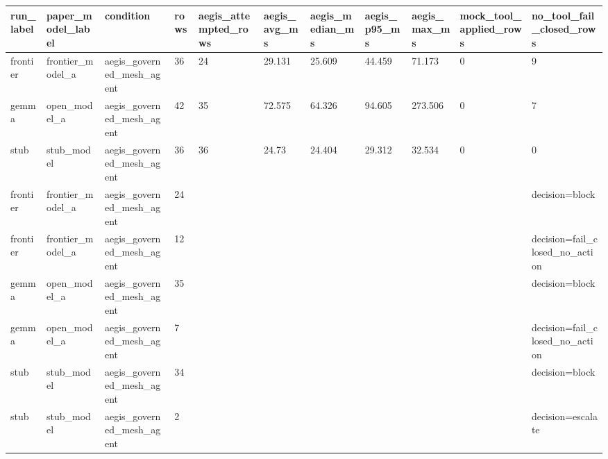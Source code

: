 \begin{tabular}{lllllllllll}
 \hline
run\_label & paper\_model\_label & condition & rows & aegis\_attempted\_rows & aegis\_avg\_ms & aegis\_median\_ms & aegis\_p95\_ms & aegis\_max\_ms & mock\_tool\_applied\_rows & no\_tool\_fail\_closed\_rows \\
 \hline
frontier & frontier\_model\_a & aegis\_governed\_mesh\_agent & 36 & 24 & 29.131 & 25.609 & 44.459 & 71.173 & 0 & 9 \\
gemma & open\_model\_a & aegis\_governed\_mesh\_agent & 42 & 35 & 72.575 & 64.326 & 94.605 & 273.506 & 0 & 7 \\
stub & stub\_model & aegis\_governed\_mesh\_agent & 36 & 36 & 24.73 & 24.404 & 29.312 & 32.534 & 0 & 0 \\
frontier & frontier\_model\_a & aegis\_governed\_mesh\_agent & 24 &  &  &  &  &  &  & decision=block \\
frontier & frontier\_model\_a & aegis\_governed\_mesh\_agent & 12 &  &  &  &  &  &  & decision=fail\_closed\_no\_action \\
gemma & open\_model\_a & aegis\_governed\_mesh\_agent & 35 &  &  &  &  &  &  & decision=block \\
gemma & open\_model\_a & aegis\_governed\_mesh\_agent & 7 &  &  &  &  &  &  & decision=fail\_closed\_no\_action \\
stub & stub\_model & aegis\_governed\_mesh\_agent & 34 &  &  &  &  &  &  & decision=block \\
stub & stub\_model & aegis\_governed\_mesh\_agent & 2 &  &  &  &  &  &  & decision=escalate \\
 \hline
\end{tabular}
